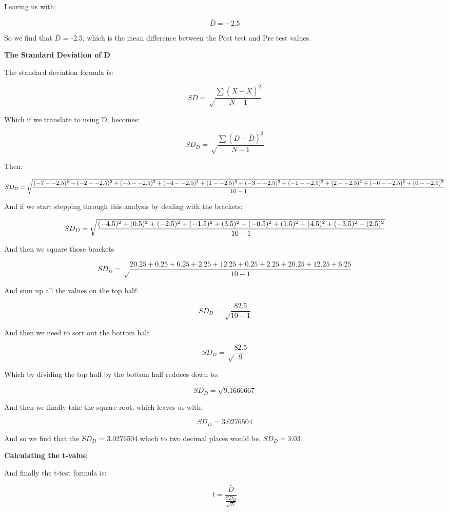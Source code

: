 \documentclass[
  oneside]{book}
\begin{document}
Leaving us with:

\[\bar{D} = -2.5\]

So we find that \(\bar{D}\) = -2.5, which is the mean difference between the Post test and Pre test values.

\textbf{The Standard Deviation of D}

The standard deviation formula is:

\[SD = \sqrt\frac{\sum(X - \bar{X})^2}{N-1}\]

Which if we translate to using D, becomes:

\[SD_{D} = \sqrt\frac{\sum(D - \bar{D})^2}{N-1}\]

Then:

\[SD_{D} =\sqrt\frac{(-7 - -2.5)^2 + (-2 - -2.5)^2 + (-5 - -2.5)^2 + (-4 - -2.5)^2 + (1 - -2.5)^2 + \\ (-3 - -2.5)^2 + (-1 - -2.5)^2 + (2 - -2.5)^2 + (-6 - -2.5)^2 + (0 - -2.5)^2}{10 - 1}\]

And if we start stepping through this analysis by dealing with the brackets:

\[SD_{D} =\sqrt\frac{(-4.5)^2 + (0.5)^2 + (-2.5)^2 + (-1.5)^2 + (3.5)^2 + \\ (-0.5)^2 + (1.5)^2 + (4.5)^2 + (-3.5)^2 + (2.5)^2}{10 - 1}\]

And then we square those brackets

\[SD_{D} =\sqrt\frac{20.25 + 0.25 + 6.25 + 2.25 + 12.25 + 0.25 + 2.25 + 20.25 + 12.25 + 6.25}{10 - 1}\]

And sum up all the values on the top half:

\[SD_{D} =\sqrt\frac{82.5}{10 - 1}\]

And then we need to sort out the bottom half

\[SD_{D} =\sqrt\frac{82.5}{9}\]

Which by dividing the top half by the bottom half reduces down to:

\[SD_{D} =\sqrt{9.1666667}\]

And then we finally take the square root, which leaves us with:

\[SD_{D} =3.0276504\]

And so we find that the \(SD_{D}\) = 3.0276504 which to two decimal places would be, \(SD_{D} = 3.03\)

\textbf{Calculating the t-value}

And finally the t-test formula is:

\[t = \frac{\bar{D}}{\frac{SD_{D}}{\sqrt{N}}}\]
\end{document}
